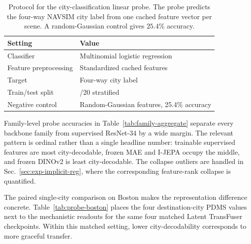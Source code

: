 \begin{table}[ht]
\centering
\caption[City-classification probe protocol.]{Protocol for the city-classification linear probe. The probe predicts the four-way NAVSIM city label from one cached feature vector per scene. A random-Gaussian control gives $25.4\%$ accuracy.}
\label{tab:exp-probe-protocol}
\small
\renewcommand{\arraystretch}{1.15}
\setlength{\tabcolsep}{6pt}
\begin{tabular}{@{}>{\raggedright\arraybackslash}p{4.2cm} >{\raggedright\arraybackslash}p{7.8cm}@{}}
\toprule
\textbf{Setting} & \textbf{Value} \\
\midrule
Classifier & Multinomial logistic regression \\
Feature preprocessing & Standardized cached features \\
Target & Four-way city label \\
Train/test split & 80/20 stratified \\
Negative control & Random-Gaussian features, 25.4\% accuracy \\
\bottomrule
\end{tabular}
\end{table}

Family-level probe accuracies in Table~\ref{tab:family-aggregate} separate every backbone family from supervised ResNet-34 by a wide margin. The relevant pattern is ordinal rather than a single headline number: trainable supervised features are most city-decodable, frozen MAE and I-JEPA occupy the middle, and frozen DINOv2 is least city-decodable. The collapse outliers are handled in Sec.~\ref{sec:exp-implicit-reg}, where the corresponding feature-rank collapse is quantified.

The paired single-city comparison on Boston makes the representation difference concrete. Table~\ref{tab:probe-boston} places the four destination-city PDMS values next to the mechanistic readouts for the same four matched Latent TransFuser checkpoints. Within this matched setting, lower city-decodability corresponds to more graceful transfer.

